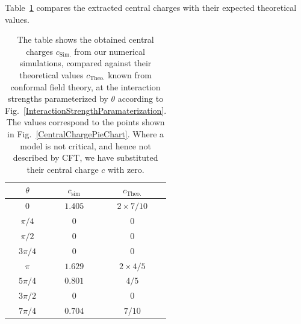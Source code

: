 \documentclass[aps,reprint,superscriptaddress,amsmath,amssymb,amsfonts,prb]{revtex4-1}
\begin{document}
{{Table~\ref{CentralChargesTable} compares} the extracted central charges with their expected theoretical values.}

\begin{table}
\begin{ruledtabular}
\begin{tabular}{  c  c  c }
$\theta$        &       $c_{\text{sim}}$    &        $c_{\text{Theo.}}$               \\ \hline
$0$             &            $1.405$        &          $2 \times 7/10$                 \\ 
$\pi/4$         &             $ 0 $         &             0                            \\  
$\pi/2$         &             $ 0 $         &             0                             \\ 
$3\pi/4$        &             $ 0 $         &             0                             \\ 
$\pi$           &             $1.629$       &         $2\times 4/5$                     \\
$5\pi/4$        &             $0.801$       &            $4/5$                          \\
$3\pi/2$        &              $0$          &             $0$                           \\
$7\pi/4$        &             $0.704$       &             $7/10$                                              \\
\end{tabular}
\end{ruledtabular}
\caption{The table shows the obtained central charges $c_{\text{Sim.}}$ from our numerical simulations, compared against their theoretical values $c_{\text{Theo.}}$ known from conformal field theory, at the interaction strengths parameterized by $\theta$ according to Fig.~\ref{InteractionStrengthParamaterization}. The values correspond to the points shown in Fig.~\ref{CentralChargePieChart}. Where a model is not critical, and hence not described by CFT, we have substituted their central charge $c$ with zero. 
\label{CentralChargesTable}}
\end{table}
\end{document}
